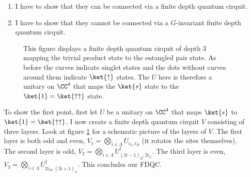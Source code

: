 \begin{enumerate}
	\item I have to show that they can be connected via a finite depth quantum cirquit.
	\item I have to show that they cannot be connected via a $G$-invariant finite depth quantum cirquit.
\end{enumerate}
\begin{figure}
	\centering
	
	\caption{This figure displays a finite depth quantum cirquit of depth 3 mapping the trivial product state to the entangled pair state. As before the curves indicate singlet states and the dots without curves around them indicate $\ket{\uparrow}$ states. The $U$ here is therefore a unitary on $\CC^4$ that maps the $\ket{s}$ state to the $\ket{1}=\ket{\uparrow\uparrow}$ state.}
	\label{fig:FakeAKLT_IsSRE}
\end{figure}
To show the first point, first let $U$ be a unitary on $\CC^4$ that maps $\ket{s}$ to $\ket{1}=\ket{\uparrow\uparrow}$. I now create a finite depth quantum cirquit $V$ consisting of three layers. Look at figure \ref{fig:FakeAKLT_IsSRE} for a schematic picture of the layers of $V$. The first layer is both odd and even, $V_1=\bigotimes_{i\in\Lambda}U_{i_L,i_R}$ (it rotates the sites themselves). The second layer is odd, $V_2=\bigotimes_{i\in\Lambda}U_{(2i-1)_R,2i_L}^\dagger$. The third layer is even, $V_3=\bigotimes_{i\in\Lambda}U_{2i_R,(2i+1)_L}^\dagger$. This concludes our FDQC.
